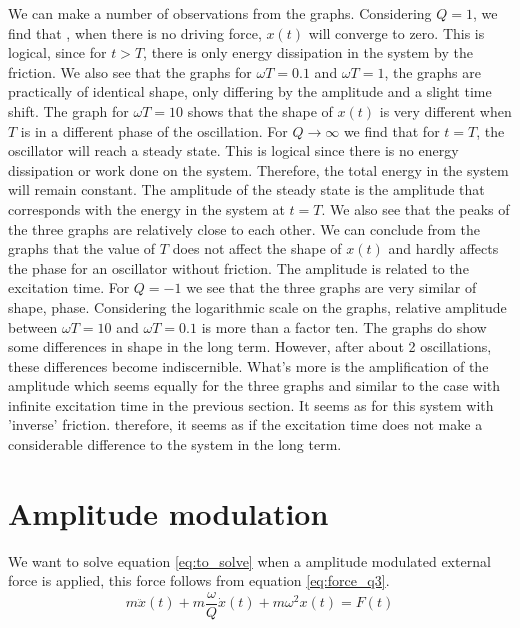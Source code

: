 We can make a number of observations from the graphs. Considering $Q = 1$, we find that , when there is no driving force, $x(t)$ will converge to zero. This is logical, since for $t>T$, there is only energy dissipation in the system by the friction. We also see that the graphs for $\omega T = 0.1$ and $\omega T =1$, the graphs are practically of identical shape, only differing by the amplitude and a slight time shift. The graph for $\omega T = 10$ shows that the shape of $x(t)$ is very different when $T$ is in a different phase of the oscillation.
For $Q \rightarrow \infty$ we find that for $t=T$, the oscillator will reach a steady state. This is logical since there is no energy dissipation or work done on the system. Therefore, the total energy in the system will remain constant. The amplitude of the steady state is the amplitude that corresponds with the energy in the system at $t=T$. We also see that the peaks of the three graphs are relatively close to each other. We can conclude from the graphs that the value of $T$ does not affect the shape of $x(t)$ and hardly affects the phase for an oscillator without friction. The amplitude is related to the excitation time.
For $Q=-1$ we see that the three graphs are very similar of shape, phase. Considering the logarithmic scale on the graphs, relative amplitude between $\omega T = 10$ and $\omega T = 0.1$ is more than a factor ten. The graphs do show some differences in shape in the long term. However, after about 2 oscillations, these differences become indiscernible. What's more is the amplification of the amplitude which seems equally for the three graphs and similar to the case with infinite excitation time in the previous section. It seems as for this system with 'inverse' friction. therefore, it seems as if the excitation time does not make a considerable difference to the system in the long term.\\


\section{Amplitude modulation}

We want to solve equation \ref{eq:to_solve} when a amplitude modulated external force is applied, this force follows from equation \ref{eq:force_q3}.\\

\begin{equation}
    m \ddot{x}(t)+m\frac{\omega}{Q}\dot{x}(t)+m \omega^2 x(t) = F(t)
    \label{eq:to_solve}
\end{equation}

